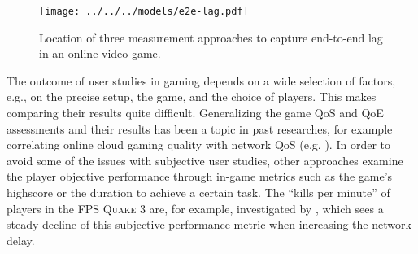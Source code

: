 \begin{figure}[!t]
    \centering
    \texttt{[image: ../../../models/e2e-lag.pdf]}
    \caption{Location of three measurement approaches to capture end-to-end lag in an online video game.}
\label{fig:measurement-methods}
\end{figure}



The outcome of user studies in gaming depends on a wide selection of factors, e.g., on the precise setup, the game, and the choice of players. This makes comparing their results quite difficult. Generalizing the game \acrshort{QoS} and \gls{QoE} assessments and their results has been a topic in past researches, for example correlating online cloud gaming quality with network \acrshort{QoS} (e.g. \cite{5976180}). In order to avoid some of the issues with subjective user studies, other approaches examine the player objective performance through in-game metrics such as the game's highscore or the duration to achieve a certain task. The ``kills per minute'' of players in the \gls{FPS} \textsc{Quake 3} are, for example, investigated by \cite{1266180}, which sees a steady decline of this subjective performance metric when increasing the network delay.

